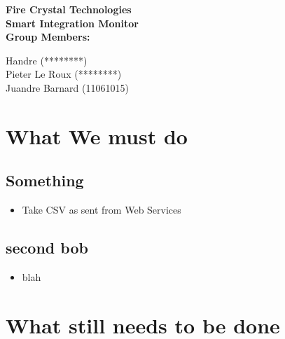 \documentclass[12pt]{article}
\newcommand{\Title}{Fire Crystal Technologies} %
\begin{document}
        \vspace{4em}
        
        \begin{center}%
        
          \LARGE \bf \Title \\[4em]
          \LARGE {\bf Smart Integration Monitor}\\[1em]
          \LARGE {\bf Group Members:}\\[2em]
          \large
          
           
             Handre (********)	\\[1em]
             Pieter Le Roux (********)		\\[1em]
             Juandre Barnard (11061015) \\[1em]
             
            
        \end{center}%
        

        \newpage
        \tableofcontents    
                \newpage
               
                \section{What We must do}
                
                
                	\subsection{Something}
                	 \begin{itemize}
                	  \item Take CSV as sent from Web Services                   
                	   \end{itemize}

                	 \subsection{ second bob}
                	 \begin{itemize}
                	  \item blah			  
                	\end{itemize}
                	 
                \section{What still needs to be done}
                
                
        
                
                        
        
        
\end{document}
